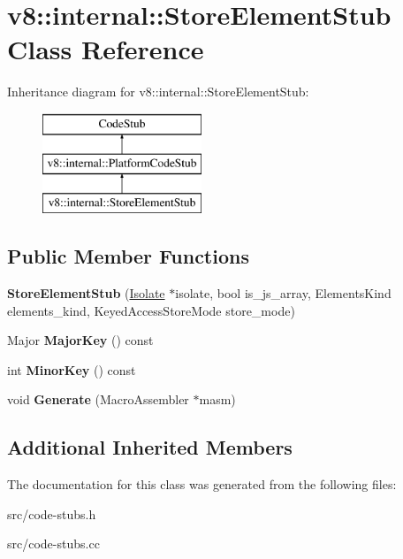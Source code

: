 \hypertarget{classv8_1_1internal_1_1_store_element_stub}{}\section{v8\+:\+:internal\+:\+:Store\+Element\+Stub Class Reference}
\label{classv8_1_1internal_1_1_store_element_stub}
Inheritance diagram for v8\+:\+:internal\+:\+:Store\+Element\+Stub\+:\begin{figure}[H]
\begin{center}
\leavevmode
\includegraphics[height=3.000000cm]{classv8_1_1internal_1_1_store_element_stub}
\end{center}
\end{figure}
\subsection*{Public Member Functions}
\begin{DoxyCompactItemize}
\item 
\hypertarget{classv8_1_1internal_1_1_store_element_stub_a252c1f358694f91f83c78a2700d4b8f2}{}{\bfseries Store\+Element\+Stub} (\hyperlink{classv8_1_1internal_1_1_isolate}{Isolate} $\ast$isolate, bool is\+\_\+js\+\_\+array, Elements\+Kind elements\+\_\+kind, Keyed\+Access\+Store\+Mode store\+\_\+mode)\label{classv8_1_1internal_1_1_store_element_stub_a252c1f358694f91f83c78a2700d4b8f2}

\item 
\hypertarget{classv8_1_1internal_1_1_store_element_stub_ae90b07320e18493136e24968347c1c10}{}Major {\bfseries Major\+Key} () const \label{classv8_1_1internal_1_1_store_element_stub_ae90b07320e18493136e24968347c1c10}

\item 
\hypertarget{classv8_1_1internal_1_1_store_element_stub_a3d895398fa9896af6908119785642393}{}int {\bfseries Minor\+Key} () const \label{classv8_1_1internal_1_1_store_element_stub_a3d895398fa9896af6908119785642393}

\item 
\hypertarget{classv8_1_1internal_1_1_store_element_stub_a35e61b28967040757975fe2de2c2c594}{}void {\bfseries Generate} (Macro\+Assembler $\ast$masm)\label{classv8_1_1internal_1_1_store_element_stub_a35e61b28967040757975fe2de2c2c594}

\end{DoxyCompactItemize}
\subsection*{Additional Inherited Members}


The documentation for this class was generated from the following files\+:\begin{DoxyCompactItemize}
\item 
src/code-\/stubs.\+h\item 
src/code-\/stubs.\+cc\end{DoxyCompactItemize}
